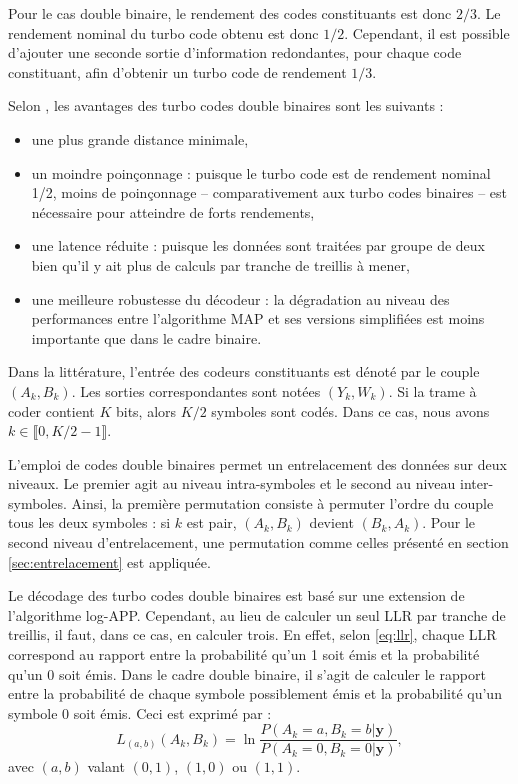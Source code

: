 Pour le cas double binaire, le rendement des codes constituants est donc $2/3$. Le rendement nominal du turbo code obtenu 
est donc $1/2$. Cependant, il est possible d'ajouter une seconde sortie  d'information redondantes, pour chaque code 
constituant, afin d'obtenir un turbo code de rendement $1/3$. 

Selon \cite{doublebinadvantages}, les avantages des turbo codes double binaires sont les suivants : 
\begin{itemize}
	\item une plus grande distance minimale,
	\item un moindre poinçonnage : puisque le turbo code est de rendement nominal 1/2, moins de poinçonnage -- comparativement 
	aux turbo codes binaires -- est nécessaire pour atteindre de forts rendements,
	\item une latence réduite : puisque les données sont traitées par groupe de deux bien qu'il y ait plus de calculs par 
	tranche de treillis à mener,
	\item une meilleure robustesse du décodeur : la dégradation au niveau des performances entre l'algorithme MAP et ses versions 
	simplifiées est moins importante que dans le cadre binaire.
\end{itemize}

Dans la littérature, l'entrée des codeurs constituants est dénoté par le couple $(A_k,B_k)$. Les sorties correspondantes 
sont notées $(Y_k,W_k)$. Si la trame à coder contient $K$ bits, alors $K/2$ symboles sont codés. Dans ce cas, nous avons 
$k \in \llbracket 0, K/2-1\rrbracket$.

L'emploi de codes double binaires permet un entrelacement des données sur deux niveaux. Le premier agit au niveau 
intra-symboles et le second au niveau inter-symboles. Ainsi, la première permutation consiste à permuter l'ordre du 
couple tous les deux symboles : si $k$ est pair, $(A_k,B_k)$ devient $(B_k,A_k)$. Pour le second niveau d'entrelacement, 
une permutation comme celles présenté en section \ref{sec:entrelacement} est appliquée.

Le décodage des turbo codes double binaires est basé sur une extension de l'algorithme log-APP. Cependant, au lieu de 
calculer un seul LLR par tranche de treillis, il faut, dans ce cas, en calculer trois. En effet, selon \ref{eq:llr}, 
chaque LLR correspond au rapport entre la probabilité qu'un 1 soit émis et la probabilité qu'un 0 soit émis. Dans le 
cadre double binaire, il s'agit de calculer le rapport entre la probabilité de chaque symbole possiblement émis et la 
probabilité qu'un symbole 0 soit émis. Ceci est exprimé par : 
\begin{equation*}
	L_{(a,b)}(A_k,B_k) = \ln\frac{P(A_k=a,B_k=b|\mathbf{y})}{P(A_k=0,B_k=0|\mathbf{y})},
\end{equation*}
avec $(a,b)$ valant $(0,1)$, $(1,0)$ ou $(1,1)$.

